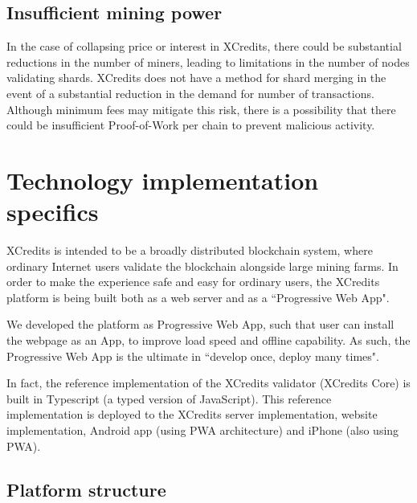 \documentclass[a4paper,12pt]{article}
\begin{document}
\subsection{Insufficient mining power}
In the case of collapsing price or interest in XCredits, there could be substantial reductions in the number of miners, leading to limitations in the number of nodes validating shards. XCredits does not have a method for shard merging in the event of a substantial reduction in the demand for number of transactions. Although minimum fees may mitigate this risk, there is a possibility that there could be insufficient Proof-of-Work per chain to prevent malicious activity. 







\section{Technology implementation specifics}
XCredits is intended to be a broadly distributed blockchain system, where ordinary Internet users validate the blockchain alongside large mining farms. In order to make the experience safe and easy for ordinary users, the XCredits platform is being built both as a web server and as a ``Progressive Web App".

We developed the platform as Progressive Web App, such that user can install the webpage as an App, to improve load speed and offline capability. As such, the Progressive Web App is the ultimate in ``develop once, deploy many times".

In fact, the reference implementation of the XCredits validator (XCredits Core) is built in Typescript (a typed version of JavaScript). This reference implementation is deployed to the XCredits server implementation, website implementation, Android app (using PWA architecture) and iPhone (also using PWA). 


\subsection{Platform structure}
\end{document}

